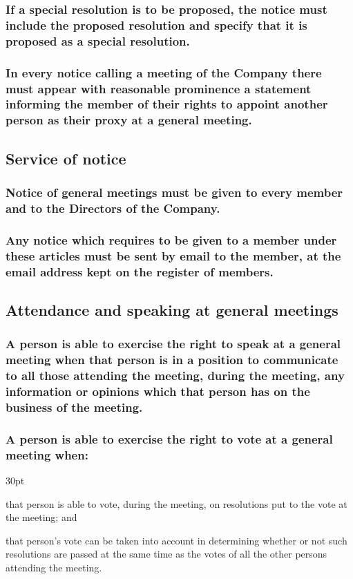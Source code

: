 \documentclass[12pt]{article}
\def\clauseindent{30pt}
\newenvironment{subindentpara}{\begin{adjustwidth}{\clauseindent}{}\begin{hanginglist}}{\end{hanginglist}\end{adjustwidth}}
\begin{document}
\subsubsection{If a special resolution is to be proposed, the notice must include the proposed resolution and specify that it is proposed as a special resolution.}
\subsubsection{In every notice calling a meeting of the Company there must appear with reasonable prominence a statement informing the member of their rights to appoint another person as their proxy at a general meeting.}

\subsection{Service of notice}
\subsubsection{Notice of general meetings must be given to every member and to the Directors of the Company.}
\subsubsection{Any notice which requires to be given to a member under these articles must be sent by email to the member, at the email address kept on the register of members.}

\subsection{Attendance and speaking at general meetings}
\subsubsection{A person is able to exercise the right to speak at a general meeting when that person is in a position to communicate to all those attending the meeting, during the meeting, any information or opinions which that person has on the business of the meeting.}
\subsubsection{A person is able to exercise the right to vote at a general meeting when:}
\begin{subindentpara}
    \item that person is able to vote, during the meeting, on resolutions put to the vote at the meeting; and
    \item that person’s vote can be taken into account in determining whether or not such resolutions are passed at the same time as the votes of all the other persons attending the meeting.
\end{subindentpara}
\end{document}
